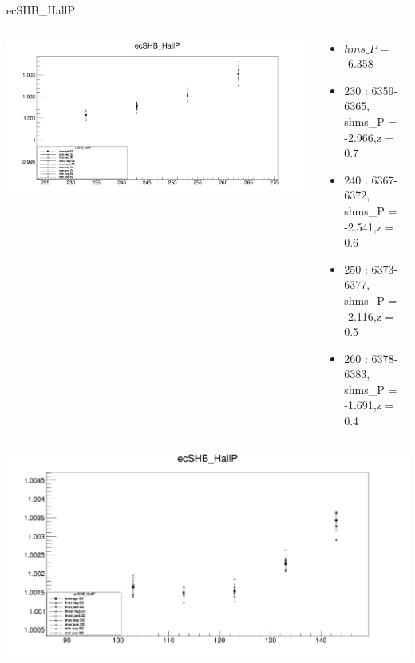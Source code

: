 \documentclass[aspectratio=169,xcolor=dvipsnames]{beamer}
\begin{document}
\begin{frame}{ecSHB\_HallP}
    \begin{columns}
    \begin{column}[T]{0.5\textwidth}
    \includegraphics[width = \textwidth]{ecSHB_HallP_zoomin.png}
    \end{column}
    \begin{column}[T]{0.5\textwidth}
      \smaller  
    \begin{itemize}
      \item $hms\_P$ = -6.358
        \item $230$ : 6359-6365, shms\_P = -2.966,z = 0.7
        \item $240$ : 6367-6372, shms\_P = -2.541,z = 0.6
        \item $250$ : 6373-6377, shms\_P = -2.116,z = 0.5
        \item $260$ : 6378-6383, shms\_P = -1.691,z = 0.4
    \end{itemize}
    \end{column}
    \end{columns}
\begin{columns}
\begin{column}[T]{0.5\textwidth}
\includegraphics[width = \textwidth]{ecSHB_HallP_zoomin2.png}

\end{column}
\end{columns}
\end{frame}
\end{document}

